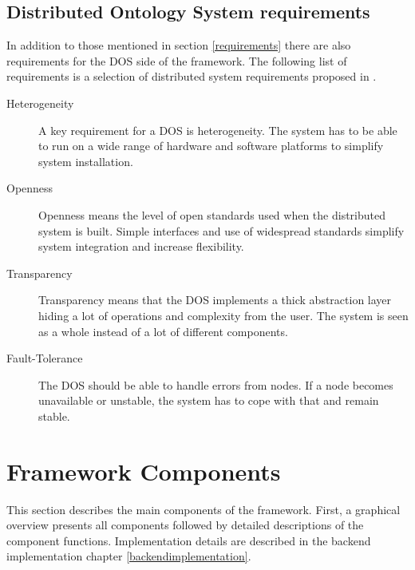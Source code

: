 \subsection{Distributed Ontology System requirements}
In addition to those mentioned in section \ref{requirements} there are also requirements
for the DOS side of the framework. The following list of requirements is a selection of
distributed system requirements proposed in \cite{hobo2004}.
\begin{description}
        \item[Heterogeneity] A key requirement for a DOS is heterogeneity. The
                system has to be able to run on a wide range of hardware and software
                platforms to simplify system installation.
        \item[Openness] Openness means the level of open standards used when the
                distributed system is built. Simple interfaces and use of widespread
                standards simplify system integration and increase flexibility.
        \item[Transparency] Transparency means that the DOS implements a
                thick abstraction layer hiding a lot of operations and complexity from
                the user. The system is seen as a whole instead of a lot of different components.
        \item[Fault-Tolerance] The DOS should be able to handle errors from nodes.
                If a node becomes unavailable or unstable, the system has to cope with
                that and remain stable.
\end{description}


\newpage


\section{Framework Components}
This section describes the main components of the framework. First, a graphical overview presents all components
followed by detailed descriptions of the component functions. Implementation details
are described in the backend implementation chapter \ref{backendimplementation}.

